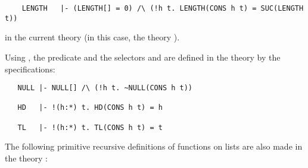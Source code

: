 \begin{hol}\begin{verbatim}
    LENGTH   |- (LENGTH[] = 0) /\ (!h t. LENGTH(CONS h t) = SUC(LENGTH t))
\end{verbatim}\end{hol}

\noindent in the current theory (in this case, the theory ).

Using  ,   the  predicate     and  the
selectors  and   are  defined
 in  the theory   by the
specifications:


\begin{hol}
\begin{verbatim}
   NULL |- NULL[] /\ (!h t. ~NULL(CONS h t))

   HD   |- !(h:*) t. HD(CONS h t) = h

   TL   |- !(h:*) t. TL(CONS h t) = t
\end{verbatim}\end{hol}

\noindent The following primitive recursive definitions of functions on lists
are also made in the theory :


